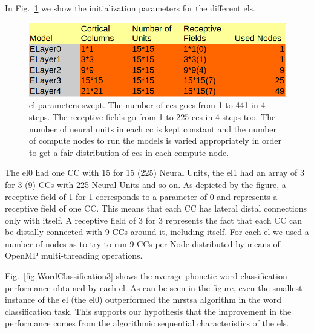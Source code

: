\documentclass{book}
\begin{document}
\begin{appendices}
In Fig.~\ref{fig:WordClassification2} we show the initialization parameters for the different \glspl{el}.

\begin{figure}[h!]
    \centering
    \includegraphics[width=1.0\textwidth]{WordClassification2.png}
    \caption{\gls{el} parameters swept. The number of \glspl{cc} goes from 1 to 441 in 4 steps. The receptive fields go from 1 to 225 \glspl{cc} in 4 steps too. The number of neural units in each \gls{cc} is kept constant and the number of compute nodes to run the models is varied appropriately in order to get a fair distribution of \glspl{cc} in each compute node.}
    \label{fig:WordClassification2}
\end{figure}


The \gls{el}0 had one CC with 15 for 15 (225) Neural Units, the \gls{el}1 had an array of 3 for 3 (9) CCs with 225 Neural Units and so on. As depicted by the figure, a receptive field of 1 for 1 corresponds to a parameter of 0 and represents a receptive field of one CC. This means that each CC has lateral distal connections only with itself. A receptive field of 3 for 3 represents the fact that each CC can be distally connected with 9 CCs around it, including itself. For each \gls{el} we used a number of nodes as to try to run 9 CCs per Node distributed by means of OpenMP multi-threading operations.

Fig.~\ref{fig:WordClassification3} shows the average phonetic word classification performance obtained by each \gls{el}. As can be seen in the figure, even the smallest instance of the \gls{el} (the \gls{el}0) outperformed the \gls{mrstsa} algorithm in the word classification task. This supports our hypothesis that the improvement in the performance comes from the algorithmic sequential characteristics of the \glspl{el}.


\end{appendices}
\end{document}
